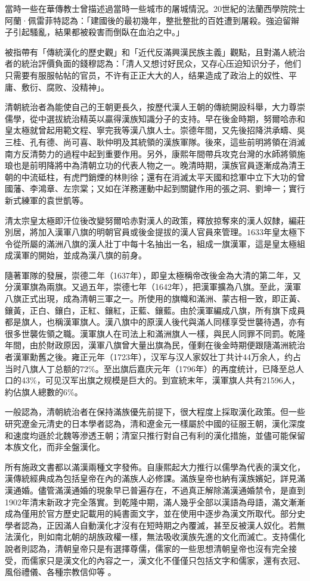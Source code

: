當時一些在華傳教士曾描述過當時一些城市的屠城情況。20世紀的法蘭西學院院士阿蘭·佩雷菲特認為：「建國後的最初幾年，整批整批的百姓遭到屠殺。強迫留辮子引起騷亂，結果都被殺害而倒臥在血泊之中。」

被指帶有「傳統漢化的歷史觀」和「近代反滿興漢民族主義」觀點，且對滿人統治者的統治評價負面的錢穆認為：「清人又想讨好民众，又存心压迫知识分子，他们只需要有服服帖帖的官员，不许有正正大大的人，结果造成了政治上的奴性、平庸、敷衍、腐败、没精神」。

清朝統治者為能使自己的王朝更長久，按歷代漢人王朝的傳統開設科舉，大力尊崇儒學，從中選拔統治精英以贏得漢族知識分子的支持。早在後金時期，努爾哈赤和皇太極就曾起用範文程、寧完我等漢八旗人士。崇德年間，又先後招降洪承疇、吳三桂、孔有德、尚可喜、耿仲明及其統領的漢族軍隊。後來，這些前明將領在消滅南方反清勢力的過程中起到重要作用。另外，康熙年間帶兵攻克台灣的水師將領施琅也是前明降將中為清朝立功的代表人物之一。晚清時期，漢族官員逐漸成為清王朝的中流砥柱，有虎門銷煙的林則徐；還有在消滅太平天國和捻軍中立下大功的曾國藩、李鴻章、左宗棠；又如在洋務運動中起到關鍵作用的張之洞、劉坤一；實行新式練軍的袁世凱等。

清太宗皇太極即汗位後改變努爾哈赤對漢人的政策，釋放掠奪來的漢人奴隸，編莊別居，將加入漢軍八旗的明朝官員或後金提拔的漢人官員來管理。1633年皇太極下令從所屬的滿洲八旗的漢人壯丁中每十名抽出一名，組成一旗漢軍，這是皇太極組成漢軍的開始，並成為漢八旗的前身。

隨著軍隊的發展，崇德二年（1637年），即皇太極稱帝改後金為大清的第二年，又分漢軍旗為兩旗。又過五年，崇德七年（1642年），把漢軍擴為八旗。至此，漢軍八旗正式出現，成為清朝三軍之一。所使用的旗幟和滿洲、蒙古相一致，即正黃、鑲黃，正白、鑲白，正紅、鑲紅，正藍、鑲藍。由於漢軍編成八旗，所有旗下成員都是旗人，也稱漢軍旗人。漢八旗中的原漢人後代與滿人同樣享受世襲待遇，亦有很多世襲佐領之職。漢軍旗人在司法上和滿洲旗人一樣，與民人同罪不同罰。乾隆年間，由於財政原因，漢軍八旗曾大量出旗為民，僅剩在後金時期便跟隨滿洲統治者漢軍勳舊之後。雍正元年（1723年），汉军与汉人家奴壮丁共计44万余人，约占当时八旗人丁总额的72\%。至出旗后嘉庆元年（1796年）的再度统计，已降至总人口的43\%，可见汉军出旗之规模是巨大的。到宣統末年，漢軍旗人共有21596人，約佔旗人總數的6\%。

一般認為，清朝統治者在保持滿族優先前提下，很大程度上採取漢化政策。但一些研究遼金元清史的日本學者認為，清和遼金元一樣屬於中國的征服王朝，漢化深度和速度均遜於北魏等滲透王朝；清室只推行對自己有利的漢化措施，並儘可能保留本族文化，而非全盤漢化。

所有施政文書都以滿漢兩種文字發佈。自康熙起大力推行以儒學為代表的漢文化，漢傳統經典成為包括皇帝在內的滿族人必修課。滿族皇帝也納有漢族嬪妃，詳見滿漢通婚。儘管滿漢通婚的現象早已普遍存在，不過真正解除滿漢通婚禁令，是直到1902年清末新政才完全落實。到乾隆中期，滿人幾乎全部以漢語為母語，滿文漸漸成為僅用於官方歷史記載用的純書面文字，並在使用中逐步為漢文所取代。部分史學者認為，正因滿人自動漢化才沒有在短時期之內覆滅，甚至反被漢人奴化。若無法漢化，則如南北朝的胡族政權一樣，無法吸收漢族先進的文化而滅亡。支持儒化說者則認為，清朝皇帝只是有選擇尊儒，儒家的一些思想清朝皇帝也沒有完全接受，而儒家只是漢文化的內容之一，漢文化不僅僅只包括文字和儒家，還有衣冠、風俗禮儀、各種宗教信仰等 。

